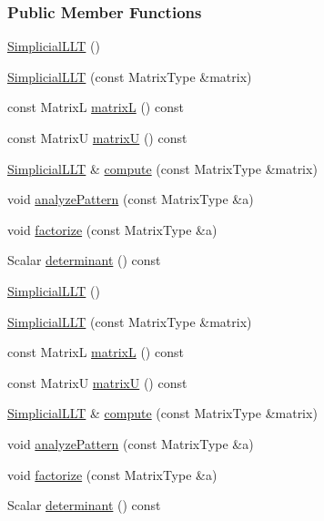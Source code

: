 \subsubsection*{Public Member Functions}
\begin{DoxyCompactItemize}
\item 
\hyperlink{group___sparse_cholesky___module_ad25633e34d7c21b77fe05c873ffbe416}{Simplicial\+L\+LT} ()
\item 
\hyperlink{group___sparse_cholesky___module_a342735f17d0306aa5581e91010091427}{Simplicial\+L\+LT} (const Matrix\+Type \&matrix)
\item 
const MatrixL \hyperlink{group___sparse_cholesky___module_ae2b24f8f6d62a8444193904988374299}{matrixL} () const
\item 
const MatrixU \hyperlink{group___sparse_cholesky___module_a23522d6444c344ddb14e48dbfac128ed}{matrixU} () const
\item 
\hyperlink{group___sparse_cholesky___module_class_eigen_1_1_simplicial_l_l_t}{Simplicial\+L\+LT} \& \hyperlink{group___sparse_cholesky___module_a24ffa253377a1cec7a44b856fae1f71a}{compute} (const Matrix\+Type \&matrix)
\item 
void \hyperlink{group___sparse_cholesky___module_ad6e49b1c0d2ec5c8e118538260f3002c}{analyze\+Pattern} (const Matrix\+Type \&a)
\item 
void \hyperlink{group___sparse_cholesky___module_a8a140b34b08df74c7426ee29b986b228}{factorize} (const Matrix\+Type \&a)
\item 
Scalar \hyperlink{group___sparse_cholesky___module_a956595848e6fac7a389d091b3fdc9567}{determinant} () const
\item 
\hyperlink{group___sparse_cholesky___module_ad25633e34d7c21b77fe05c873ffbe416}{Simplicial\+L\+LT} ()
\item 
\hyperlink{group___sparse_cholesky___module_a342735f17d0306aa5581e91010091427}{Simplicial\+L\+LT} (const Matrix\+Type \&matrix)
\item 
const MatrixL \hyperlink{group___sparse_cholesky___module_ae2b24f8f6d62a8444193904988374299}{matrixL} () const
\item 
const MatrixU \hyperlink{group___sparse_cholesky___module_a23522d6444c344ddb14e48dbfac128ed}{matrixU} () const
\item 
\hyperlink{group___sparse_cholesky___module_class_eigen_1_1_simplicial_l_l_t}{Simplicial\+L\+LT} \& \hyperlink{group___sparse_cholesky___module_a24ffa253377a1cec7a44b856fae1f71a}{compute} (const Matrix\+Type \&matrix)
\item 
void \hyperlink{group___sparse_cholesky___module_ad6e49b1c0d2ec5c8e118538260f3002c}{analyze\+Pattern} (const Matrix\+Type \&a)
\item 
void \hyperlink{group___sparse_cholesky___module_a8a140b34b08df74c7426ee29b986b228}{factorize} (const Matrix\+Type \&a)
\item 
Scalar \hyperlink{group___sparse_cholesky___module_a956595848e6fac7a389d091b3fdc9567}{determinant} () const
\end{DoxyCompactItemize}
